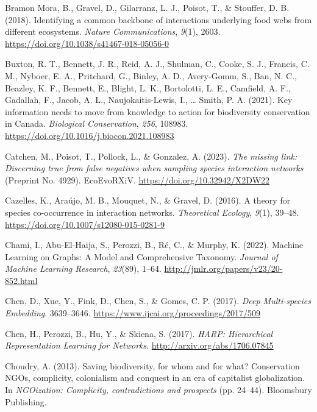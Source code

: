 \documentclass[10pt,oneside]{article}
\newlength{\cslhangindent}
\newenvironment{CSLReferences}[2] %
 {%
  \setlength{\parindent}{0pt}
  \ifodd #1 \everypar{\setlength{\hangindent}{\cslhangindent}}\ignorespaces\fi
  \ifnum #2 > 0
  \setlength{\parskip}{#2\baselineskip}
  \fi
 }%
 {}
\begin{document}
\begin{CSLReferences}{1}{0}
\leavevmode{}%
Bramon Mora, B., Gravel, D., Gilarranz, L. J., Poisot, T., \& Stouffer,
D. B. (2018). Identifying a common backbone of interactions underlying
food webs from different ecosystems. \emph{Nature Communications},
\emph{9}(1), 2603. \url{https://doi.org/10.1038/s41467-018-05056-0}

\leavevmode{}%
Buxton, R. T., Bennett, J. R., Reid, A. J., Shulman, C., Cooke, S. J.,
Francis, C. M., Nyboer, E. A., Pritchard, G., Binley, A. D., Avery-Gomm,
S., Ban, N. C., Beazley, K. F., Bennett, E., Blight, L. K., Bortolotti,
L. E., Camfield, A. F., Gadallah, F., Jacob, A. L., Naujokaitis-Lewis,
I., \ldots{} Smith, P. A. (2021). Key information needs to move from
knowledge to action for biodiversity conservation in Canada.
\emph{Biological Conservation}, \emph{256}, 108983.
\url{https://doi.org/10.1016/j.biocon.2021.108983}

\leavevmode{}%
Catchen, M., Poisot, T., Pollock, L., \& Gonzalez, A. (2023). \emph{The
missing link: Discerning true from false negatives when sampling species
interaction networks} (Preprint No. 4929). EcoEvoRXiV.
\url{https://doi.org/10.32942/X2DW22}

\leavevmode{}%
Cazelles, K., Araújo, M. B., Mouquet, N., \& Gravel, D. (2016). A theory
for species co-occurrence in interaction networks. \emph{Theoretical
Ecology}, \emph{9}(1), 39--48.
\url{https://doi.org/10.1007/s12080-015-0281-9}

\leavevmode{}%
Chami, I., Abu-El-Haija, S., Perozzi, B., Ré, C., \& Murphy, K. (2022).
Machine Learning on Graphs: A Model and Comprehensive Taxonomy.
\emph{Journal of Machine Learning Research}, \emph{23}(89), 1--64.
\url{http://jmlr.org/papers/v23/20-852.html}

\leavevmode{}%
Chen, D., Xue, Y., Fink, D., Chen, S., \& Gomes, C. P. (2017).
\emph{Deep Multi-species Embedding}. 3639--3646.
\url{https://www.ijcai.org/proceedings/2017/509}

\leavevmode{}%
Chen, H., Perozzi, B., Hu, Y., \& Skiena, S. (2017). \emph{HARP:
Hierarchical Representation Learning for Networks}.
\url{http://arxiv.org/abs/1706.07845}

\leavevmode{}%
Choudry, A. (2013). Saving biodiversity, for whom and for what?
Conservation NGOs, complicity, colonialism and conquest in an era of
capitalist globalization. In \emph{NGOization: Complicity,
contradictions and prospects} (pp. 24--44). Bloomsbury Publishing.


\end{CSLReferences}
\end{document}
